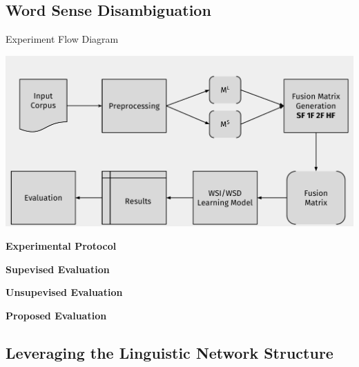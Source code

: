 \documentclass[10pt,xcolor=table]{beamer}
\begin{document}
\subsection{Word Sense Disambiguation}
\begin{frame}{Experiment Flow Diagram}
\begin{center}
\includegraphics[width=0.9\linewidth]{image2/Chapitre4/diag_metodoWSD.pdf}
\end{center}
\end{frame}

\begin{frame}
\large \textbf{Experimental Protocol}
\end{frame}


\begin{frame}
\large \textbf{Supevised Evaluation}
\end{frame}


\begin{frame}
\large \textbf{Unsupevised Evaluation}
\end{frame}

\begin{frame}
\large \textbf{Proposed Evaluation}
\end{frame}

\subsection{Leveraging the Linguistic Network Structure}
\end{document}
